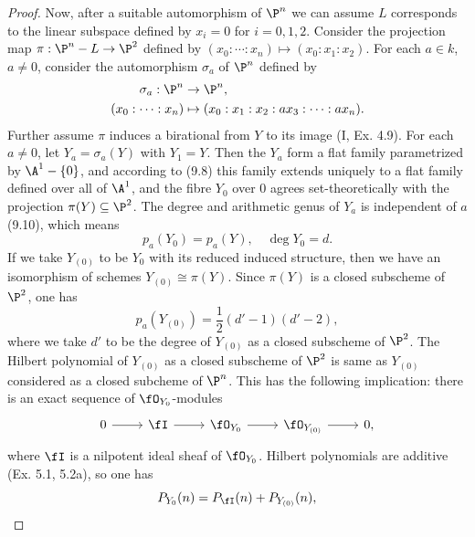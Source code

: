 \documentclass[a4paper]{article}
\begin{document}
\begin{enumerate} [label=\textbf{\arabic*.}, leftmargin=0em]
\begin{proof}
          Now, after a suitable automorphism of $\P^n$ we can assume $L$ corresponds to the linear subspace defined by $x_i = 0$ for $i = 0, 1, 2$.
          Consider the projection map $\pi : \P^n - L \to \P^2$ defined by $(x_0 : \cdots : x_n) \mapsto (x_0 : x_1 : x_2)$.
          For each $a \in k$, $a \neq 0$, consider the automorphism $\sigma_a$ of $\P^n$ defined by
          \begin{align*}
            \sigma_a : \P^n      & \to \P^n,                                         \\
            (x_0 : \cdots : x_n) & \mapsto (x_0 : x_1 : x_2 : ax_3 : \cdots : ax_n).
          \end{align*}
          Further assume $\pi$ induces a birational from $Y$ to its image (I, Ex. 4.9).
          For each $a \neq 0$, let $Y_a = \sigma_a(Y)$ with $Y_1 = Y$.
          Then the $Y_a$ form a flat family parametrized by $\A^1 - \{0\}$, and according to (9.8) this family extends uniquely to a flat family defined over all of $\A^1$, and the fibre $Y_0$ over 0 agrees set-theoretically with the projection $\pi(Y) \subseteq \P^2$.
          The degree and arithmetic genus of $Y_a$ is independent of $a$ (9.10), which means
          \begin{equation*}
            p_a(Y_0) = p_a(Y), \quad \deg{Y_0} = d.
          \end{equation*}
          If we take $Y_{(0)}$ to be $Y_0$ with its reduced induced structure, then we have an isomorphism of schemes $Y_{(0)} \cong \pi(Y)$.
          Since $\pi(Y)$ is a closed subscheme of $\P^2$, one has
          \begin{equation*}
            p_a(Y_{(0)}) = \frac{1}{2}(d' - 1)(d' - 2),
          \end{equation*}
          where we take $d'$ to be the degree of $Y_{(0)}$ as a closed subscheme of $\P^2$.
          The Hilbert polynomial of $Y_{(0)}$ as a closed subscheme of $\P^2$ is same as $Y_{{(0)}}$ considered as a closed subcheme of $\P^n$.
          This has the following implication: there is an exact sequence of $\fO_{Y_0}$-modules
          \[ \begin{tikzcd}
              0 \arrow[r] & \fI \arrow[r] & \fO_{Y_0} \arrow[r] & \fO_{Y_{(0)}} \arrow[r] & 0,
            \end{tikzcd} \]
          where $\fI$ is a nilpotent ideal sheaf of $\fO_{Y_0}$.
          Hilbert polynomials are additive (Ex. 5.1, 5.2a), so one has
          \begin{equation*}
            P_{Y_{0}}(n) = P_{\fI}(n) + P_{Y_{(0)}}(n),

\end{equation*}
\end{proof}
\end{enumerate}
\end{document}
